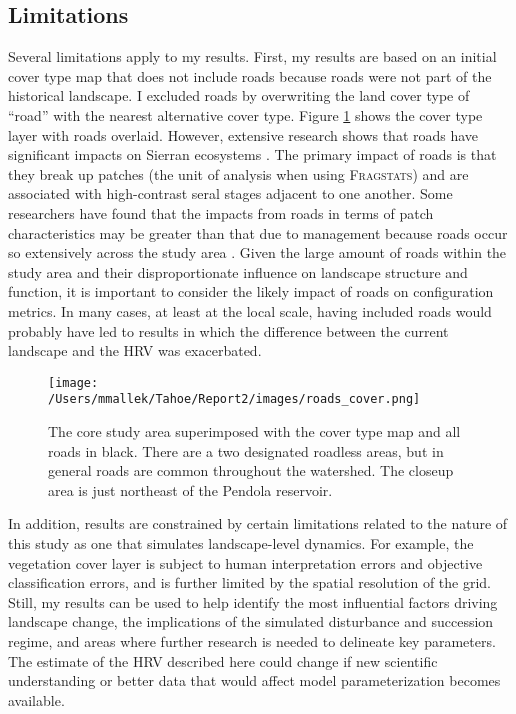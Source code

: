 \subsection{Limitations}
Several limitations apply to my results. First, my results are based on an initial cover type map that does not include roads because roads were not part of the historical landscape. I excluded roads by overwriting the land cover type of ``road'' with the nearest alternative cover type. Figure \ref{fig:roadcovermap} shows the cover type layer with roads overlaid. However, extensive research shows that roads have significant impacts on Sierran ecosystems \citep{Trombulak2000,Gucinski2001,Karr2004,Theobald2011}. The primary impact of roads is that they break up patches (the unit of analysis when using \textsc{Fragstats}) and are associated with high-contrast seral stages adjacent to one another. Some researchers have found that the impacts from roads in terms of patch characteristics may be greater than that due to management because roads occur so extensively across the study area \citep{Tinker1998,Gucinski2001,McGarigal2001}. Given the large amount of roads within the study area and their disproportionate influence on landscape structure and function, it is important to consider the likely impact of roads on configuration metrics. In many cases, at least at the local scale, having included roads would probably have led to results in which the difference between the current landscape and the HRV was exacerbated.
%
\begin{figure}[!htbp]
  \centering
  \texttt{[image: /Users/mmallek/Tahoe/Report2/images/roads\_cover.png]}
  \caption{The core study area superimposed with the cover type map and all roads in black. There are a two designated roadless areas, but in general roads are common throughout the watershed. The closeup area is just northeast of the Pendola reservoir.} 
  \label{fig:roadcovermap}
\end{figure}
%

In addition, results are constrained by certain limitations related to the nature of this study as one that simulates landscape-level dynamics. For example, the vegetation cover layer is subject to human interpretation errors and objective classification errors, and is further limited by the spatial resolution of the grid. Still, my results can be used to help identify the most influential factors driving landscape change, the implications of the simulated disturbance and succession regime, and areas where further research is needed to delineate key parameters. The estimate of the HRV described here could change if new scientific understanding or better data that would affect model parameterization becomes available.

